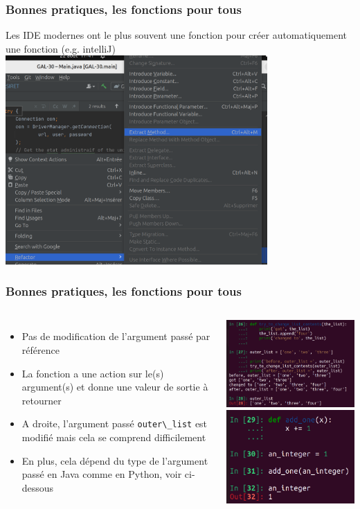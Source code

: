 \documentclass{beamer}
\begin{document}
    \begin{frame}
        \transdissolve
        \frametitle{Bonnes pratiques, les fonctions pour tous}
        Les IDE modernes ont le plus souvent une fonction pour créer automatiquement une fonction (e.g. intelliJ)
        \centering
        \includegraphics[width=10cm]{image/ide-gen-function.png}
    \end{frame}

    \begin{frame}
        \transdissolve
        \frametitle{Bonnes pratiques, les fonctions pour tous}
        \begin{columns}
            \begin{itemize}

                \item Pas de modification de l'argument passé par référence
                \item La fonction a une action sur le(s) argument(s) et donne une valeur de sortie à retourner
                \item A droite, l'argument passé \lstinline{outer\_list} est modifié mais cela se comprend difficilement
                \item En plus, cela dépend du type de l'argument passé en Java comme en Python, voir ci-dessous

            \end{itemize}
            \centering
            \includegraphics[width=5cm]{image/arg-modified-by-reference.png}
            \includegraphics[width=5cm]{image/arg-not-modified.png}
        \end{columns}
    \end{frame}
\end{document}
